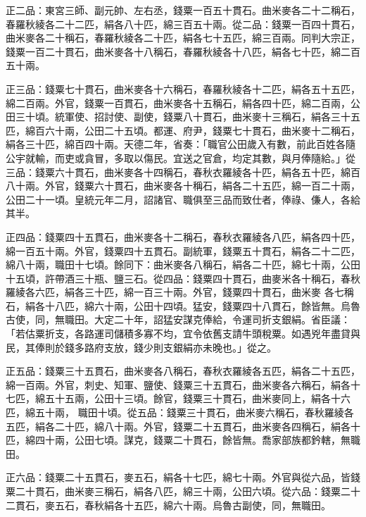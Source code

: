 \begin{pinyinscope}
 正二品：東宮三師、副元帥、左右丞，錢粟一百五十貫石。曲米麥各二十二稱石，春羅秋綾各二十二匹，絹各八十匹，綿三百五十兩。從二品：錢粟一百四十貫石，曲米麥各二十稱石，春羅秋綾各二十匹，絹各七十五匹，綿三百兩。同判大宗正，錢粟一百二十貫石，曲米麥各十八稱石，春羅秋綾各十八匹，絹各七十匹，綿二百五十兩。



 正三品：錢粟七十貫石，曲米麥各十六稱石，春羅秋綾各十二匹，絹各五十五匹，綿二百兩。外官，錢粟一百貫石，曲米麥各十五稱石，絹各四十匹，綿二百兩，公田三十頃。統軍使、招討使、副使，錢粟八十貫石，曲米麥十三稱石，絹各三十五匹，綿百六十兩，公田二十五頃。都運、府尹，錢粟七十貫石，曲米麥十二稱石，絹各三十匹，綿百四十兩。天德二年，省奏：「職官公田歲入有數，前此百姓各隨公宇就輸，而吏或貪冒，多取以傷民。宜送之官倉，均定其數，與月俸隨給。」從三品：錢粟六十貫石，曲米麥各十四稱石，春秋衣羅綾各十匹，絹各五十匹，綿百
 八十兩。外官，錢粟六十貫石，曲米麥各十稱石，絹各二十五匹，綿一百二十兩，公田二十一頃。皇統元年二月，詔諸官、職俱至三品而致仕者，俸祿、傔人，各給其半。



 正四品：錢粟四十五貫石，曲米麥各十二稱石，春秋衣羅綾各八匹，絹各四十匹，綿一百五十兩。外官，錢粟四十五貫石。副統軍，錢粟五十貫石，絹各二十二匹，綿八十兩，職田十七頃。餘同下：曲米麥各八稱石，絹各二十匹，綿七十兩，公田十五頃，許帶酒三十瓶、鹽三石。從四品：錢粟四十貫石，曲麥米各十稱石，春秋羅綾各六匹，絹各三十匹，綿一百三十兩。外官，錢粟四十貫石，曲米麥
 各七稱石，絹各十八匹，綿六十兩，公田十四頃。猛安，錢粟四十八貫石，餘皆無。烏魯古使，同，無職田。大定二十年，詔猛安謀克俸給，令運司折支銀絹。省臣議：「若估粟折支，各路運司儲積多寡不均，宜令依舊支請牛頭稅粟。如遇兇年盡貸與民，其俸則於錢多路府支放，錢少則支銀絹亦未晚也。」從之。



 正五品：錢粟三十五貫石，曲米麥各八稱石，春秋衣羅綾各五匹，絹各二十五匹，綿一百兩。外官，刺史、知軍、鹽使、錢粟三十五貫石，曲米麥各六稱石，絹各十七匹，綿五十五兩，公田十三頃。餘官，錢粟三十貫石，曲米麥同上，絹各十六匹，綿五十兩，
 職田十頃。從五品：錢粟三十貫石，曲米麥六稱石，春秋羅綾各五匹，絹各二十匹，綿八十兩。外官，錢粟二十五貫石，曲米麥各四稱石，絹各十匹，綿四十兩，公田七頃。謀克，錢粟二十貫石，餘皆無。喬家部族都鈐轄，無職田。



 正六品：錢粟二十五貫石，麥五石，絹各十七匹，綿七十兩。外官與從六品，皆錢粟二十貫石，曲米麥三稱石，絹各八匹，綿三十兩，公田六頃。從六品：錢粟二十二貫石，麥五石，春秋絹各十五匹，綿六十兩。烏魯古副使，同，無職田。




\end{pinyinscope}

